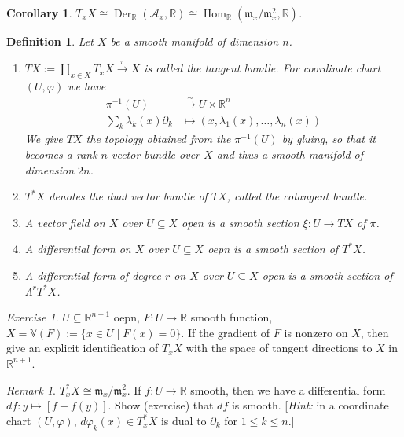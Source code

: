 \documentclass[12pt]{article}
\theoremstyle{darkgreentheorem}
\newtheorem{cor}[thm]{Corollary}
\theoremstyle{darkbluedefinition}
\newtheorem{defn}[thm]{Definition}
\theoremstyle{darkredexample}
\theoremstyle{remark}
\newtheorem{rem}[thm]{Remark}
\newtheorem{exe}[thm]{Exercise}
\newcommand{\R}{\mathbb{R}}
\newcommand{\1}{\mathbbm{1}}
\newcommand{\V}{\mathbb{V}}
\newcommand{\calA}{\mathcal{A}}
\newcommand{\m}{\mathfrak{m}}
\DeclareMathOperator{\Hom}{Hom}
\DeclareMathOperator{\Der}{Der}
\newcommand{\tms}{\times}
\newcommand{\sub}{\subseteq}
\begin{document}
\begin{cor}
    $T_{x}X\cong \Der_{\R}(\calA_{x},\R)\cong \Hom_{\R}(\m_{x}/\m_{x}^{2},\R)$.
\end{cor}

\begin{defn}
    Let $X$ be a smooth manifold of dimension $n$.
    \begin{enumerate}
	\item $TX:=\coprod_{x\in X}T_{x}X\xrightarrow{\pi}X$ is called the \textit{tangent bundle}.
	    For coordinate chart $(U,\varphi)$ we have
	    \begin{align*}
		\pi^{-1}(U)&\xrightarrow{\sim} U\tms \R^{n}\\
		\sum_{k}\lambda_{k}(x)\partial_{k}&\mapsto (x,\lambda_{1}(x),\ldots,\lambda_{n}(x))
	    \end{align*}
	    We give $TX$ the topology obtained from the $\pi^{-1}(U)$ by gluing, so that it becomes a rank $n$ vector bundle over $X$ and thus a smooth manifold of dimension $2n$.
	\item $T^{*}X$ denotes the dual vector bundle of $TX$, called the \textit{cotangent bundle}.
	\item A \textit{vector field} on $X$ over $U\sub X$ open is a smooth section $\xi\colon U\to TX$ of $\pi$.
	\item A \textit{differential form} on $X$ over $U\sub X$ oepn is a smooth section of $T^{*}X$.
	\item A \textit{differential form} of degree $r$ on $X$ over $U\sub X$ open is a smooth section of $\Lambda^{r}T^{*}X$.
    \end{enumerate}
\end{defn}

\begin{exe}
    $U\sub \R^{n+1}$ oepn, $F\colon U\to \R$ smooth function, $X=\V(F):=\{ x\in U\mid F(x)=0\}$.
    If the gradient of $F$ is nonzero on $X$, then give an explicit identification of $T_{x}X$ with the space of tangent directions to $X$ in $\R^{n+1}$.
\end{exe}

\begin{rem}
    $T_{x}^{*}X\cong \m_{x}/\m_{x}^{2}$.
    If $f\colon U\to \R$ smooth, then we have a differential form $df\colon y\mapsto [f-f(y)]$.
    Show (exercise) that $df$ is smooth.
    [\textit{Hint:} in a coordinate chart $(U,\varphi)$, $d\varphi_{k}(x)\in T_{x}^{*}X$ is dual to $\partial_{k}$ for $1\leqslant k\leqslant n$.]
\end{rem}
\end{document}
